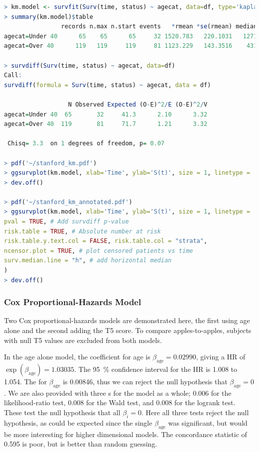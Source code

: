 \begin{lstlisting}[language=R]
> km.model <- survfit(Surv(time, status) ~ agecat, data=df, type='kaplan-meier')
> summary(km.model)$table
                records n.max n.start events   *rmean *se(rmean) median 0.95LCL 0.95UCL
agecat=Under 40      65    65      65     32 1520.783   220.1031   1271     731      NA
agecat=Over 40      119   119     119     81 1123.229   143.3516    431     202     897

> survdiff(Surv(time, status) ~ agecat, data=df)
Call:
survdiff(formula = Surv(time, status) ~ agecat, data = df)

                  N Observed Expected (O-E)^2/E (O-E)^2/V
agecat=Under 40  65       32     41.3      2.10      3.32
agecat=Over 40  119       81     71.7      1.21      3.32

 Chisq= 3.3  on 1 degrees of freedom, p= 0.07

> pdf('~/stanford_km.pdf')
> ggsurvplot(km.model, xlab='Time', ylab='S(t)', size = 1, linetype = 'strata', palette=c('#4e79a7', '#f28e2b'), conf.int = TRUE, legend = c(0.85, 0.85), legend.y = 1, legend.title = '', legend.labs = c('Under 40', 'Over 40'))
> dev.off()

> pdf('~/stanford_km_annotated.pdf')
> ggsurvplot(km.model, xlab='Time', ylab='S(t)', size = 1, linetype = 'strata', palette=c('#4e79a7', '#f28e2b'), conf.int = TRUE, legend = c(0.85, 0.85), legend.y = 1, legend.title = '', legend.labs = c('Under 40', 'Over 40'),
pval = TRUE, # Add survdiff p-value
risk.table = TRUE, # Absolute number at risk
risk.table.y.text.col = FALSE, risk.table.col = "strata",
ncensor.plot = TRUE, # plot censored patients vs time
surv.median.line = "h", # add horizontal median
)
> dev.off()
\end{lstlisting}

\subsubsection{Cox Proportional-Hazards Model}
\label{additional:Survival:Rcode:cox}
Two Cox proportional-hazards models are demonstrated here,
the first using age alone and the second adding the T5 score.
To compare apples-to-apples, subjects with null T5 values are excluded from both models.

In the age alone model, the coefficient for age is
$\beta_{\text{age}} = \num{0.02990}$, giving a HR of
$\exp\left(\beta_{\text{age}}\right) = \num{1.03035}$.
The \SI{95}{\percent} confidence interval for the HR is {1.008} to \num{1.054}.
The \pvalue for $\beta_{\text{age}}$ is \num{0.00846},
thus we can reject the null hypothesis that $\beta_{\text{age}} = 0$.
We are also provided with three {\pvalue}s for the model as a whole;
\num{0.006} for the likelihood-ratio test,
\num{0.008} for the Wald test,
and \num{0.008} for the logrank test.
These test the null hypothesis that all $\beta_{i} = 0$.
Here all three tests reject the null hypothesis,
as could be expected since the single $\beta_{\text{age}}$ was significant,
but would be more interesting for higher dimensional models.
The concordance statistic of \num{0.595} is poor, but is better than random guessing.

